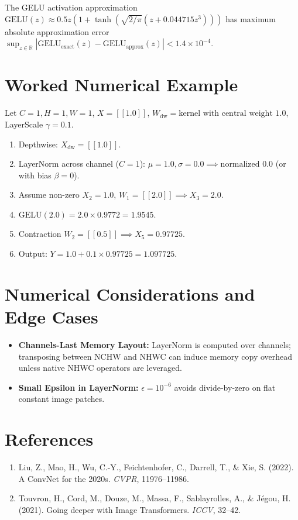 \documentclass[11pt,a4paper]{article}
\theoremstyle{definition}
\begin{document}
The GELU activation approximation $\text{GELU}(z) \approx 0.5z(1 + \tanh(\sqrt{2/\pi}(z + 0.044715 z^3)))$ has maximum absolute approximation error $\sup_{z \in \mathbb{R}} |\text{GELU}_{\text{exact}}(z) - \text{GELU}_{\text{approx}}(z)| < 1.4 \times 10^{-4}$.

\section{Worked Numerical Example}

Let $C=1, H=1, W=1$, $X = [[1.0]]$, $W_{\text{dw}} = \text{kernel with central weight } 1.0$, LayerScale $\gamma = 0.1$.
\begin{enumerate}
    \item Depthwise: $X_{\text{dw}} = [[1.0]]$.
    \item LayerNorm across channel ($C=1$): $\mu = 1.0, \sigma = 0.0 \implies \text{normalized } 0.0$ (or with bias $\beta=0$).
    \item Assume non-zero $X_2 = 1.0$, $W_1 = [[2.0]] \implies X_3 = 2.0$.
    \item $\text{GELU}(2.0) = 2.0 \times 0.9772 = 1.9545$.
    \item Contraction $W_2 = [[0.5]] \implies X_5 = 0.97725$.
    \item Output: $Y = 1.0 + 0.1 \times 0.97725 = 1.097725$.
\end{enumerate}

\section{Numerical Considerations and Edge Cases}

\begin{itemize}
    \item \textbf{Channels-Last Memory Layout:} LayerNorm is computed over channels; transposing between NCHW and NHWC can induce memory copy overhead unless native NHWC operators are leveraged.
    \item \textbf{Small Epsilon in LayerNorm:} $\epsilon = 10^{-6}$ avoids divide-by-zero on flat constant image patches.
\end{itemize}

\section{References}
\begin{enumerate}
    \item Liu, Z., Mao, H., Wu, C.-Y., Feichtenhofer, C., Darrell, T., \& Xie, S. (2022). A ConvNet for the 2020s. \emph{CVPR}, 11976--11986.
    \item Touvron, H., Cord, M., Douze, M., Massa, F., Sablayrolles, A., \& J{\'e}gou, H. (2021). Going deeper with Image Transformers. \emph{ICCV}, 32--42.
\end{enumerate}
\end{document}
